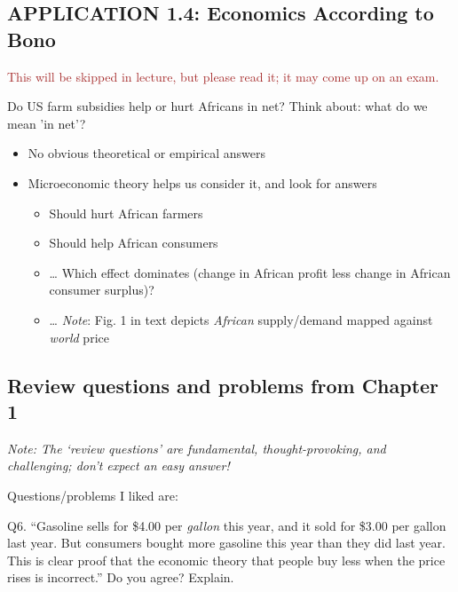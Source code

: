 \documentclass[]{article}
\providecommand{\tightlist}{%
  \setlength{\itemsep}{0pt}\setlength{\parskip}{0pt}}
\begin{document}
\hypertarget{application-1.4-economics-according-to-bono}{%
\subsection{APPLICATION 1.4: Economics According to Bono}\label{application-1.4-economics-according-to-bono}}

\textcolor{brown}{This will be skipped in lecture, but please read it; it may come up on an exam.}

Do US farm subsidies help or hurt Africans in net? \textcolor{RawSienna}{Think about: what do we mean 'in net'?}

\begin{itemize}
\tightlist
\item
  No obvious theoretical or empirical answers
\item
  Microeconomic theory helps us consider it, and look for answers

  \begin{itemize}
  \tightlist
  \item
    Should hurt African farmers
  \item
    Should help African consumers
  \item
    \ldots{} Which effect dominates (change in African profit less change in African consumer surplus)?
  \item
    \ldots{} \emph{Note}: Fig. 1 in text depicts \emph{African} supply/demand mapped against \emph{world} price
  \end{itemize}
\end{itemize}

\hypertarget{review-questions-and-problems-from-chapter-1}{%
\subsection{Review questions and problems from Chapter 1}\label{review-questions-and-problems-from-chapter-1}}

\emph{Note: The `review questions' are fundamental, thought-provoking, and challenging; don't expect an easy answer!}

Questions/problems I liked are:

Q6. ``Gasoline sells for \$4.00 per \emph{gallon} this year, and it sold for \$3.00 per gallon last year. But consumers bought more gasoline this year than they did last year. This is clear proof that the economic theory that people buy less when the price rises is incorrect.'' Do you agree? Explain.
\end{document}
